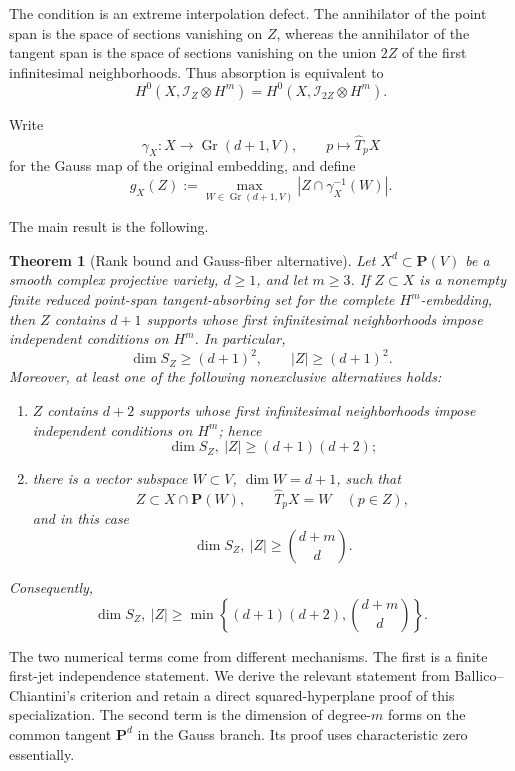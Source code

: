 \documentclass[11pt]{article}
\newtheorem{theorem}{Theorem}[section]
\newcommand{\PP}{\mathbf P}
\newcommand{\Gr}{\operatorname{Gr}}
\begin{document}
The condition is an extreme interpolation defect.  The annihilator of the
point span is the space of sections vanishing on $Z$, whereas the annihilator
of the tangent span is the space of sections vanishing on the union $2Z$ of
the first infinitesimal neighborhoods.  Thus absorption is equivalent to
\begin{equation}\label{eq:kernel-equality}
 H^0(X,\mathcal I_Z\otimes H^m)
 =H^0(X,\mathcal I_{2Z}\otimes H^m).
\end{equation}

Write
\[
 \gamma_X:X\longrightarrow\Gr(d+1,V),\qquad
 p\longmapsto\widehat T_pX
\]
for the Gauss map of the original embedding, and define
\begin{equation}\label{eq:gauss-multiplicity}
 g_X(Z):=\max_{W\in\Gr(d+1,V)}|Z\cap\gamma_X^{-1}(W)|.
\end{equation}

The main result is the following.

\begin{theorem}[Rank bound and Gauss-fiber alternative]\label{thm:main}
Let $X^d\subset\PP(V)$ be a smooth complex projective variety, $d\geq1$,
and let $m\geq3$.  If $Z\subset X$ is a nonempty finite reduced
point-span tangent-absorbing set for the complete $H^m$-embedding, then
$Z$ contains $d+1$ supports whose first infinitesimal neighborhoods impose
independent conditions on $H^m$.  In particular,
\begin{equation}\label{eq:baseline}
 \dim S_Z\geq(d+1)^2,\qquad |Z|\geq(d+1)^2.
\end{equation}
Moreover, at least one of the following nonexclusive alternatives holds:
\begin{enumerate}[label=(\alph*)]
\item $Z$ contains $d+2$ supports whose first infinitesimal neighborhoods
impose independent conditions on $H^m$; hence
\[
 \dim S_Z,\ |Z|\geq(d+1)(d+2);
\]
\item there is a vector subspace $W\subset V$, $\dim W=d+1$, such that
\[
 Z\subset X\cap\PP(W),\qquad \widehat T_pX=W\quad(p\in Z),
\]
and in this case
\[
 \dim S_Z,\ |Z|\geq\binom{d+m}{d}.
\]
\end{enumerate}
Consequently,
\begin{equation}\label{eq:main-bound}
 \boxed{\quad
 \dim S_Z,\ |Z|\geq
 \min\left\{(d+1)(d+2),\binom{d+m}{d}\right\}.
 \quad}
\end{equation}
\end{theorem}

The two numerical terms come from different mechanisms.  The first is a
finite first-jet independence statement.  We derive the relevant statement
from Ballico--Chiantini's criterion \cite[Theorem~3.5]{BallicoChiantini2021}
and retain a direct squared-hyperplane proof of this specialization.  The
second term is the dimension of degree-$m$ forms on the common tangent
$\PP^d$ in the Gauss branch.  Its proof uses characteristic zero essentially.
\end{document}
